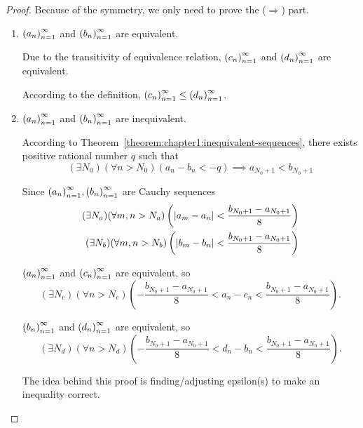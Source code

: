 \begin{proof}
    Because of the symmetry, we only need to prove the ($\Rightarrow$) part.

    \begin{enumerate}[label={\textbf{Case \arabic*.}},itemindent=0.5cm]
        \item ${\left({a_{n}}\right)}^{\infty}_{n=1}$ and ${\left({b_{n}}\right)}^{\infty}_{n=1}$ are equivalent.

              Due to the transitivity of equivalence relation, ${\left({c_{n}}\right)}^{\infty}_{n=1}$ and ${\left({d_{n}}\right)}^{\infty}_{n=1}$ are equivalent.

              According to the definition, ${\left({c_{n}}\right)}^{\infty}_{n=1}\le{\left({d_{n}}\right)}^{\infty}_{n=1}$.
        \item ${\left({a_{n}}\right)}^{\infty}_{n=1}$ and ${\left({b_{n}}\right)}^{\infty}_{n=1}$ are inequivalent.

              According to Theorem~\ref{theorem:chapter1:inequivalent-sequences}, there exists positive rational number $q$ such that
              \[
                  (\exists N_{0})(\forall n > N_{0})(a_{n} - b_{n} < -q) \implies a_{N_{0} + 1} < b_{N_{0} + 1}
              \]

              Since ${\left({a_{n}}\right)}^{\infty}_{n=1}, {\left({b_{n}}\right)}^{\infty}_{n=1}$ are Cauchy sequences
              \[
                  \begin{split}
                      (\exists N_{a})(\forall m, n > N_{a})\left(\left\vert{a_{m} - a_{n}}\right\vert < \frac{b_{N_{0} + 1} - a_{N_{0} + 1}}{8}\right) \\
                      (\exists N_{b})(\forall m, n > N_{b})\left(\left\vert{b_{m} - b_{n}}\right\vert < \frac{b_{N_{0} + 1} - a_{N_{0} + 1}}{8}\right)
                  \end{split}
              \]

              ${\left({a_{n}}\right)}^{\infty}_{n=1}$ and ${\left({c_{n}}\right)}^{\infty}_{n=1}$ are equivalent, so
              \[
                  (\exists N_{c})(\forall n > N_{c})\left(-\frac{b_{N_{0}+1} - a_{N_{0}+1}}{8} < a_{n} - c_{n} < \frac{b_{N_{0}+1} - a_{N_{0}+1}}{8}\right).
              \]

              ${\left({b_{n}}\right)}^{\infty}_{n=1}$ and ${\left({d_{n}}\right)}^{\infty}_{n=1}$ are equivalent, so
              \[
                  (\exists N_{d})(\forall n > N_{d})\left(-\frac{b_{N_{0}+1} - a_{N_{0}+1}}{8} < d_{n} - b_{n} < \frac{b_{N_{0}+1} - a_{N_{0}+1}}{8}\right).
              \]

              The idea behind this proof is finding/adjusting epsilon\@(s) to make an inequality correct.


\end{enumerate}
\end{proof}
